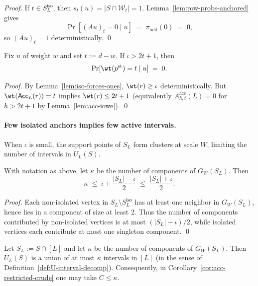\begin{proof}
If $t\in S^{\mathrm{iso}}_L$, then $s_t(u)=|S\cap \mathcal W_t|=1$.
Lemma~\ref{lem:row-probs-anchored} gives
\[
\Pr[(Au)_t=0\mid u] \;=\; \pi_{\mathrm{odd}}(0) \;=\; 0,
\]
so $(Au)_t=1$ deterministically.
\qed
\end{proof}

\begin{corollary}
\label{cor:iso-excludes}
Fix $u$ of weight $w$ and set $t:=d-w$.
If $\iota>2t+1$, then
\[
\Pr[\wt(p^{\mathrm{st}})=t\mid u] \;=\; 0.
\]
\end{corollary}

\begin{proof}
By Lemma~\ref{lem:iso-forces-ones}, $\wt(r)\ge \iota$ deterministically.
But $\wt({\sf Acc}_L(r))=t$ implies $\wt(r)\le 2t+1$ (equivalently $A^{\mathrm{acc}}_{h,t}(L)=0$ for $h>2t+1$ by
Lemma~\ref{lem:acc-iowe}).
\qed
\end{proof}

\paragraph{Few isolated anchors implies few active intervals.}
When $\iota$ is small, the support points of $S_L$ form clusters at scale $W$, limiting the number of intervals in $U_L(S)$.

\begin{lemma}
\label{lem:components-vs-isolated}
With notation as above, let $\kappa$ be the number of components of $G_W(S_L)$.
Then
\[
\kappa \;\le\; \iota + \frac{|S_L|-\iota}{2} \;\le\; \frac{|S_L|+\iota}{2}.
\]
\end{lemma}

\begin{proof}
Each non-isolated vertex in $S_L\setminus S^{\mathrm{iso}}_L$ has at least one neighbor in $G_W(S_L)$, hence lies in a
component of size at least $2$.
Thus the number of components contributed by non-isolated vertices is at most $(|S_L|-\iota)/2$, while isolated vertices
each contribute at most one singleton component.
\qed
\end{proof}

\begin{lemma}
\label{lem:U-intervals-from-components}
Let $S_L:=S\cap[L]$ and let $\kappa$ be the number of components of $G_W(S_L)$.
Then $U_L(S)$ is a union of at most $\kappa$ intervals in $[L]$ (in the sense of
Definition~\ref{def:U-interval-decomp}).
Consequently, in Corollary~\ref{cor:acc-restricted-crude} one may take $C\le \kappa$.
\end{lemma}

